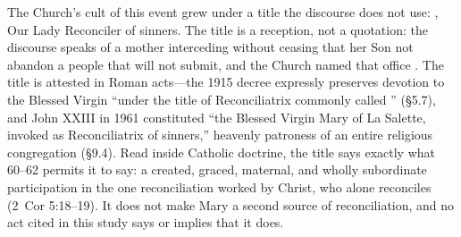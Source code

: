 The Church's cult of this event grew under a title the discourse
does not use: , Our Lady
Reconciler of sinners. The title is a reception, not a quotation:
the discourse speaks of a mother interceding without ceasing that
her Son not abandon a people that will not submit, and the Church
named that office . The title is attested in
Roman acts---the 1915 decree expressly preserves devotion to the
Blessed Virgin ``under the title of Reconciliatrix commonly called
'' (\S5.7), and John XXIII in 1961 constituted
``the Blessed Virgin Mary of La Salette, invoked as Reconciliatrix
of sinners,'' heavenly patroness of an entire religious congregation
(\S9.4). Read inside Catholic doctrine, the title says exactly what
 60--62 permits it to say: a created, graced,
maternal, and wholly subordinate participation in the one
reconciliation worked by Christ, who alone reconciles (2~Cor
5:18--19). It does not make Mary a second source of reconciliation,
and no act cited in this study says or implies that it
does.
